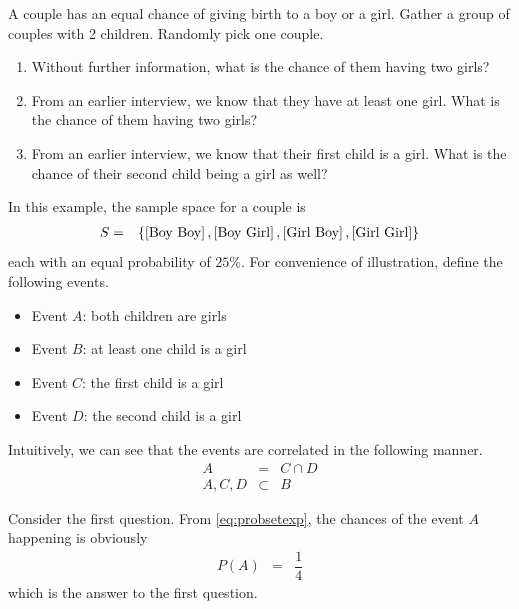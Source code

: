 \begin{shortbox}

A couple has an equal chance of giving birth to a boy or a girl. Gather a group of couples with 2 children. Randomly pick one couple.

\begin{enumerate}
	\item Without further information, what is the chance of them having two girls?
	\item From an earlier interview, we know that they have at least one girl. What is the chance of them having two girls?
	\item From an earlier interview, we know that their first child is a girl. What is the chance of their second child being a girl as well?
\end{enumerate}

\end{shortbox}

In this example, the sample space for a couple is 
\begin{eqnarray}
S &=& \left\{\left[\textup{Boy Boy}\right], \left[\textup{Boy Girl}\right], \left[\textup{Girl Boy}\right], \left[\textup{Girl Girl}\right]\right\} \label{eq:probsetexp}
\end{eqnarray}
each with an equal probability of $25\%$. For convenience of illustration, define the following events.
\begin{itemize}
	\item Event $A$: both children are girls
	\item Event $B$: at least one child is a girl
	\item Event $C$: the first child is a girl
	\item Event $D$: the second child is a girl
\end{itemize}

Intuitively, we can see that the events are correlated in the following manner.
\begin{eqnarray}
	A &=& C \cap D \nonumber \\
	A, C, D &\subset& B \nonumber
\end{eqnarray}

Consider the first question. From \eqref{eq:probsetexp}, the chances of the event $A$ happening is obviously
\begin{eqnarray}
P(A) &=& \dfrac{1}{4} \nonumber
\end{eqnarray}
which is the answer to the first question.

